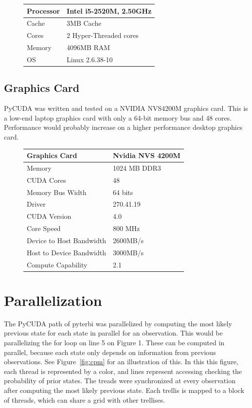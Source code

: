 \documentclass[journal,onecolumn]{IEEEtran}
\begin{document}
    \begin{figure}[!h]
            \begin{tabular}{ | l | l |}
                \hline
                Processor & Intel i5-2520M, 2.50GHz \\ \hline
                Cache & 3MB Cache \\ \hline
                Cores & 2 Hyper-Threaded cores \\ \hline
                Memory & 4096MB RAM \\ \hline
                OS & Linux 2.6.38-10 \\ \hline
            \end{tabular}
    \end{figure}
    
\subsection{Graphics Card}
    PyCUDA was written and tested on a NVIDIA NVS4200M graphics card. This is a low-end laptop graphics card with only a 64-bit memory bus and 48 cores. Performance would probably increase on a higher performance desktop graphics card. 
     \begin{figure}[!h]
            \begin{tabular}{ | l | l |}
                \hline
                Graphics Card& Nvidia NVS 4200M \\ \hline
                Memory & 1024 MB DDR3\\ \hline
                CUDA Cores & 48 \\ \hline
                Memory Bus Width & 64 bits\\ \hline
                Driver & 270.41.19 \\ \hline
                CUDA Version & 4.0 \\ \hline
                Core Speed & 800 MHz \\ \hline
                Device to Host Bandwidth & 2600MB/s \\ \hline
                Host to Device Bandwidth & 3000MB/s \\ \hline
                Compute Capability & 2.1 \\ \hline
            \end{tabular}
    \end{figure}

\section{Parallelization}
        The PyCUDA path of pyterbi was parallelized by computing the most likely previous state for each state in parallel for an observation. This would be parallelizing the for loop on line 5 on Figure 1. These can be computed in parallel, because each state only depends on information from previous observations. See Figure~\ref{fig:cpm} for an illustration of this. In this this figure, each thread is represented by a color, and lines represent accessing checking the probability of prior states. The treads were synchronized at every observation after computing the most likely previous state. Each trellis is mapped to a block of threads, which can share a grid with other trellises. 
\end{document}
